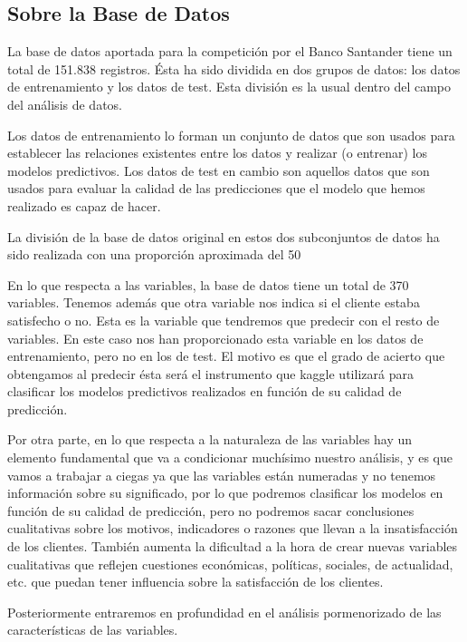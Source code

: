 \documentclass[11pt,a4paper,spanish]{article} %
\begin{document}
\subsection{Sobre la Base de Datos}
La base de datos aportada para la competición por el Banco Santander tiene un total de 151.838 registros. Ésta ha sido dividida en dos grupos de datos: los datos de entrenamiento y los datos de test. Esta división es la usual dentro del campo del análisis de datos. 

Los datos de entrenamiento lo forman un conjunto de datos que son usados para establecer las relaciones existentes entre los datos y realizar (o entrenar) los modelos predictivos. 
Los datos de test en cambio son aquellos datos que son usados para evaluar la calidad de las predicciones que el modelo que hemos realizado es capaz de hacer.

La división de la base de datos original en estos dos subconjuntos de datos ha sido realizada con una proporción aproximada del 50%

En lo que respecta a las variables, la base de datos tiene un total de 370 variables. Tenemos además que otra variable nos indica si el cliente estaba satisfecho o no. Esta es la variable que tendremos que predecir con el resto de variables. En este caso nos han proporcionado esta variable en los datos de entrenamiento, pero no en los de test. El motivo es que el grado de acierto que obtengamos al predecir ésta será el instrumento que kaggle utilizará para clasificar los modelos predictivos realizados en función de su calidad de predicción. 

Por otra parte, en lo que respecta a la naturaleza de las variables hay un elemento fundamental que va a condicionar muchísimo nuestro análisis, y es que vamos a trabajar a ciegas ya que las variables están numeradas y no tenemos información sobre su significado, por lo que podremos clasificar los modelos en función de su calidad de predicción, pero no podremos sacar conclusiones cualitativas sobre los motivos, indicadores o razones que llevan a la insatisfacción de los clientes. También aumenta la dificultad a la hora de crear nuevas variables cualitativas que reflejen cuestiones económicas, políticas, sociales, de actualidad, etc. que puedan tener influencia sobre la satisfacción de los clientes.

Posteriormente entraremos en profundidad en el análisis pormenorizado de las características de las variables. 
\end{document}
